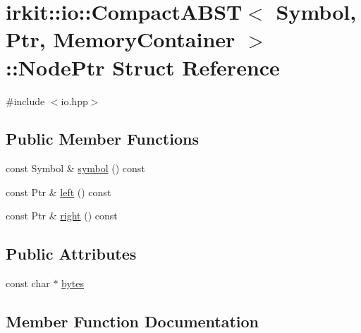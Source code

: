 \hypertarget{structirkit_1_1io_1_1CompactABST_1_1NodePtr}{}\section{irkit\+:\+:io\+:\+:Compact\+A\+B\+ST$<$ Symbol, Ptr, Memory\+Container $>$\+:\+:Node\+Ptr Struct Reference}
\label{structirkit_1_1io_1_1CompactABST_1_1NodePtr}


{\ttfamily \#include $<$io.\+hpp$>$}

\subsection*{Public Member Functions}
\begin{DoxyCompactItemize}
\item 
const Symbol \& \mbox{\hyperlink{structirkit_1_1io_1_1CompactABST_1_1NodePtr_a5e558b7c92168f58a0f2e16b64c5ad9d}{symbol}} () const
\item 
const Ptr \& \mbox{\hyperlink{structirkit_1_1io_1_1CompactABST_1_1NodePtr_a3f201e0b220cbd047aab31ae1e1970a0}{left}} () const
\item 
const Ptr \& \mbox{\hyperlink{structirkit_1_1io_1_1CompactABST_1_1NodePtr_ab3cc9218c2c86b79504ab2db97d27914}{right}} () const
\end{DoxyCompactItemize}
\subsection*{Public Attributes}
\begin{DoxyCompactItemize}
\item 
const char $\ast$ \mbox{\hyperlink{structirkit_1_1io_1_1CompactABST_1_1NodePtr_abfda312190220ac1265fe00a6317d371}{bytes}}
\end{DoxyCompactItemize}


\subsection{Member Function Documentation}
\mbox{\label{structirkit_1_1io_1_1CompactABST_1_1NodePtr_a3f201e0b220cbd047aab31ae1e1970a0}} 

